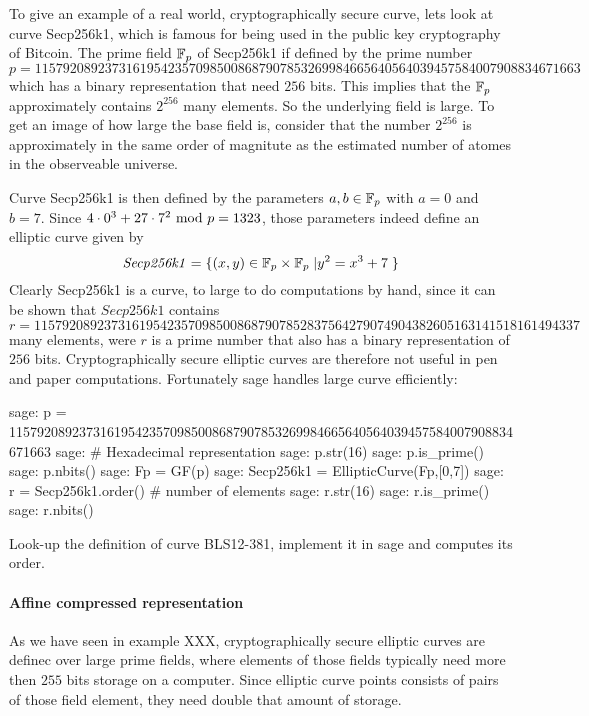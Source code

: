 \begin{example}To give an example of a real world, cryptographically secure curve, lets look at curve Secp256k1, which is famous for being used in the public key cryptography of Bitcoin. The prime field $\mathbb{F}_p$ of Secp256k1 if defined by the prime number
$$
p = \scriptstyle 115792089237316195423570985008687907853269984665640564039457584007908834671663
$$
which has a binary representation that need $256$ bits. This implies that the $\mathbb{F}_p$ approximately contains $2^{256}$ many elements. So the underlying field is large. To get an image of how large the base field is, consider that the number $2^{256}$ is approximately in the same order of magnitute as the estimated number of atomes in the observeable universe.

Curve Secp256k1 is then defined by the parameters $a,b\in \mathbb{F}_p$ with $a=0$ and $b=7$. Since $4\cdot 0^3 + 27\cdot 7^2 \text{ mod } p=1323$, those parameters indeed define an elliptic curve given by
$$
\mathit{Secp256k1} = \{(x,y)\in \mathbb{F}_p\times \mathbb{F}_p\;| y^2 = x^3 +7\;\}
$$
Clearly Secp256k1 is a curve, to large to do computations by hand, since it can be shown that $\mathit{Secp256k1}$ contains
$$
r = \scriptstyle 11579208923731619542357098500868790785283756427907490438260516
3141518161494337
$$
many elements, were $r$ is a prime number that also has a binary representation of $256$ bits. Cryptographically secure elliptic curves are therefore not useful in pen and paper computations. Fortunately sage handles large curve efficiently:
\begin{sagecommandline}
sage: p = 115792089237316195423570985008687907853269984665640564039457584007908834671663
sage: # Hexadecimal representation
sage: p.str(16)
sage: p.is_prime()
sage: p.nbits()
sage: Fp = GF(p)
sage: Secp256k1 = EllipticCurve(Fp,[0,7])
sage: r = Secp256k1.order() # number of elements
sage: r.str(16)
sage: r.is_prime()
sage: r.nbits()
\end{sagecommandline}
\end{example}
\begin{exercise}
Look-up the definition of curve BLS12-381, implement it in sage and computes its order.
\end{exercise}
\paragraph{Affine compressed representation} As we have seen in example XXX, cryptographically secure elliptic curves are definec over large prime fields, where elements of those fields typically need more then $255$ bits storage on a computer. Since elliptic curve points consists of pairs of those field element, they need double that amount of storage.

